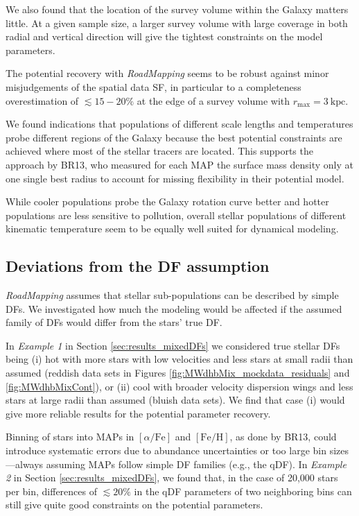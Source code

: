 \documentclass[iop,revtex4,numberedappendix,appendixfloats]{emulateapj}
\newcommand{\MAP}{MAP}
\newcommand{\MAPs}{MAPs}
\newcommand{\RM}{{\sl RoadMapping}}
\begin{document}
We also found that the location of the survey volume within the Galaxy matters little. At a given sample size, a larger survey volume with large coverage in both radial and vertical direction will give the tightest constraints on the model parameters.

The potential recovery with \RM{} seems to be robust against minor misjudgements of the spatial data SF, in particular to a completeness overestimation of $\lesssim 15-20\%$ at the edge of a survey volume with $r_\text{max}=3~\text{kpc}$.

We found indications that populations of different scale lengths and temperatures probe different regions of the Galaxy because the best potential constraints are achieved where most of the stellar tracers are located. This supports the approach by BR13, who measured for each \MAP{} the surface mass density only at one single best radius to account for missing flexibility in their potential model. 

While cooler populations probe the Galaxy rotation curve better and hotter populations are less sensitive to pollution, overall stellar populations of different kinematic temperature seem to be equally well suited for dynamical modeling.\\

\subsection{Deviations from the DF assumption}

\RM{} assumes that stellar sub-populations can be described by simple DFs. We investigated how much the modeling would be affected if the assumed family of DFs would differ from the stars' true DF.

In \emph{Example 1} in Section \ref{sec:results_mixedDFs} we considered true stellar DFs being (i) hot with more stars with low velocities and less stars at small radii than assumed (reddish data sets in Figures \ref{fig:MWdhbMix_mockdata_residuals} and \ref{fig:MWdhbMixCont}), or (ii) cool with broader velocity dispersion wings and less stars at large radii than assumed (bluish data sets). We find that case (i) would give more reliable results for the potential parameter recovery.

Binning of stars into \MAPs{} in $[\alpha/\mathrm{Fe}]$ and $[\mathrm{Fe}/\mathrm{H}]$, as done by BR13, could introduce systematic errors due to abundance uncertainties or too large bin sizes---always assuming \MAPs{} follow simple DF families (e.g., the qDF). In \emph{Example 2} in Section \ref{sec:results_mixedDFs}, we found that, in the case of 20,000 stars per bin, differences of $\lesssim 20\%$ in the qDF parameters of two neighboring bins can still give quite good constraints on the potential parameters.
\end{document}
